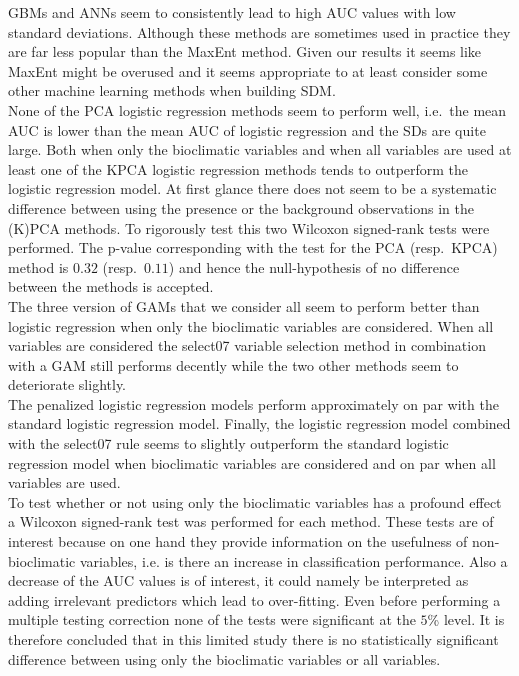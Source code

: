 GBMs and ANNs seem to consistently lead to high AUC values with low standard deviations. Although these methods are sometimes used in practice they are far less popular than the MaxEnt method. Given our results it seems like MaxEnt might be overused and it seems appropriate to at least consider some other machine learning methods when building SDM. \\ 

None of the PCA logistic regression methods seem to perform well, i.e.\ the mean AUC is lower than the mean AUC of logistic regression and the SDs are quite large. Both when only the bioclimatic variables and when all variables are used at least one of the KPCA logistic regression methods tends to outperform the logistic regression model. At first glance there does not seem to be a systematic difference between using the presence or the background observations in the (K)PCA methods. To rigorously test this two Wilcoxon signed-rank tests were performed. The p-value corresponding with the test for the PCA (resp.\ KPCA) method is $0.32$ (resp.\ $0.11$) and hence the null-hypothesis of no difference between the methods is accepted. \\

The three version of GAMs that we consider all seem to perform better than logistic regression when only the bioclimatic variables are considered. When all variables are considered the select07 variable selection method in combination with a GAM still performs decently while the two other methods seem to deteriorate slightly.  \\

The penalized logistic regression models perform approximately on par with the standard logistic regression model. Finally, the logistic regression model combined with the select07 rule seems to slightly outperform the standard logistic regression model when bioclimatic variables are considered and on par when all variables are used. \\

To test whether or not using only the bioclimatic variables has a profound effect a Wilcoxon signed-rank test was performed for each method. These tests are of interest because on one hand they provide information on the usefulness of non-bioclimatic variables, i.e. is there an increase in classification performance. Also a decrease of the AUC values is of interest, it could namely be interpreted as adding irrelevant predictors which lead to over-fitting. Even before performing a multiple testing correction none of the tests were significant at the $5$\% level. It is therefore concluded that in this limited study there is no statistically significant difference between using only the bioclimatic variables or all variables. 

